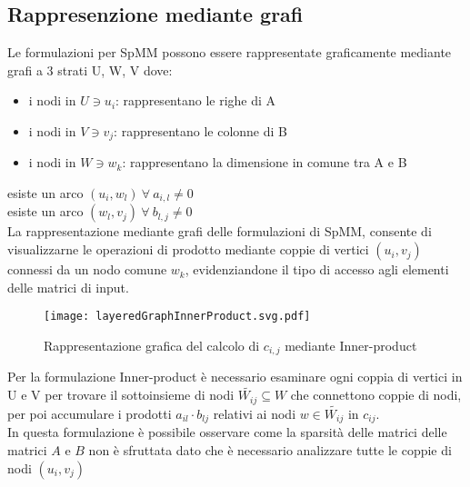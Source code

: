 \subsection{Rappresenzione mediante grafi}
Le formulazioni per SpMM possono essere rappresentate graficamente mediante
grafi a 3 strati U, W, V {\bf {}} dove:
\begin{itemize}
  \item i nodi in $U \ni u_i$:   rappresentano le righe di A
  \item i nodi in $V \ni v_j$:   rappresentano le colonne di B
  \item i nodi in $W \ni w_k$:   rappresentano la dimensione in comune tra A e B
\end{itemize}
esiste un arco $(u_i,w_l) ~ \forall ~ a_{i,l} \neq 0$\\
esiste un arco $(w_l,v_j) ~ \forall ~ b_{l,j} \neq 0$\\
La rappresentazione mediante grafi delle formulazioni di SpMM, consente di visualizzarne le operazioni di prodotto
mediante coppie di vertici $(u_i,v_j)$ connessi da un nodo comune $w_k$,
evidenziandone il tipo di accesso agli elementi delle matrici di input.\\
\begin{figure}[H]
  \centering \texttt{[image: layeredGraphInnerProduct.svg.pdf]} 
  \caption[grafo rappresentativo formulazione Inner-Product]
  {Rappresentazione grafica del calcolo di $c_{i,j}$ mediante Inner-product}
  \decoRule \label{fig:layeredGraphInnerProduct}
\end{figure}
Per la formulazione Inner-product %
è necessario esaminare ogni coppia di vertici  in U e V per trovare 
il sottoinsieme di nodi $\tilde{W_{ij}} \subseteq W$ che connettono coppie di nodi,
per poi accumulare i prodotti $a_{il} \cdot b_{lj}$ relativi ai nodi $w\in \tilde{W_{ij}}$ in $c_{ij}$.\\
In questa formulazione è possibile osservare come la sparsità delle matrici delle matrici $A$ e $B$ non è sfruttata 
dato che è necessario analizzare tutte le coppie di nodi $(u_i,v_j)$\\
